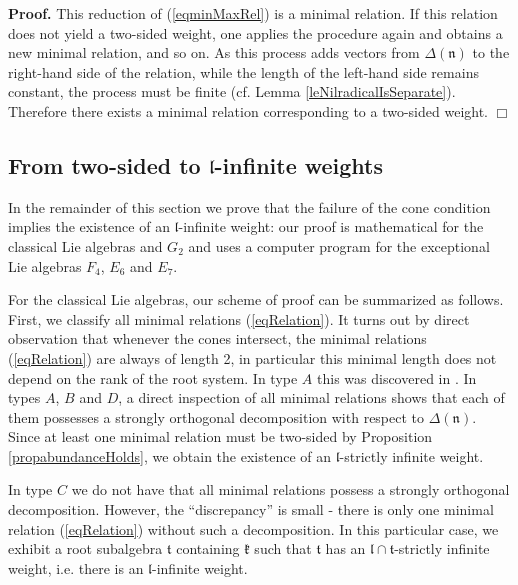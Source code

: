 \documentclass[12pt]{report}
\newenvironment{proof}[1][]{ \textbf{Proof#1. }}{$\Box$\medskip}
\newcommand{\tT}{\mathfrak{t}}
\newcommand{\kk}{\mathfrak{k}}
\newcommand{\nn}{\mathfrak{n}}
\newcommand{\lL}{\mathfrak{l}}
\newcommand{\refeq}[1]{(\ref{#1})}
\begin{document}
\begin{proof}
This reduction of (\ref{eqminMaxRel}) is a minimal relation. If this relation does not yield a two-sided weight, one applies the procedure again and obtains a new minimal relation, and so on. As this process adds vectors from $\Delta(\nn)$ to the right-hand side of the relation, while the length of the left-hand side remains constant, the process must be finite (cf. Lemma \ref{leNilradicalIsSeparate}). Therefore there exists a minimal relation corresponding to a two-sided weight.
\end{proof}
\subsection{From two-sided to $\lL$-infinite weights}
In the remainder of this section we prove that the failure of the cone condition implies the existence of an $\lL$-infinite weight: our proof is mathematical for the classical Lie algebras and $G_2$ and uses a computer program for the exceptional Lie algebras $F_4$, $E_6$ and $E_7$.

For the classical Lie algebras, our scheme of proof can be summarized as follows. First, we classify all minimal relations (\ref{eqRelation}). It turns out by direct observation that whenever the cones intersect, the minimal relations (\ref{eqRelation}) are always of length 2, in particular this minimal length does not depend on the rank of the root system. In type $A$ this was discovered in \cite{PSZ}. In types $A$, $B$ and $D$, a direct inspection of all minimal relations shows that each of them possesses a strongly orthogonal decomposition with respect to $\Delta(\nn)$. Since at least one minimal relation must be two-sided by Proposition \ref{propabundanceHolds}, we obtain the existence of an $\lL$-strictly infinite weight. 

In type $C$ we do not have that all minimal relations possess a strongly orthogonal decomposition. However, the ``discrepancy'' is small - there is only one minimal relation (\ref{eqRelation}) without such a decomposition. In this particular case, we exhibit a root subalgebra $\tT$ containing $\kk$ such that $\tT$ has an $\lL\cap\tT$-strictly infinite weight, i.e. there is an $\lL$-infinite weight.
\end{document}
